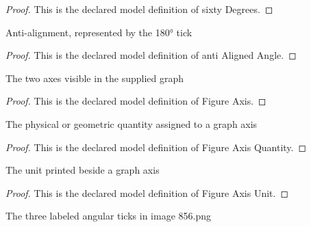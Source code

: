 \begin{proof}
  This is the declared model definition of sixty Degrees.
\end{proof}
\begin{definition}
  \label{def:physics:phyx-mini-0856:phyxminiproblems-problemphyxmini0856-antialignedangle}
  Anti-alignment, represented by the 180° tick
\end{definition}
\begin{proof}
  This is the declared model definition of anti Aligned Angle.
\end{proof}
\begin{definition}
  \label{def:physics:phyx-mini-0856:phyxminiproblems-problemphyxmini0856-figureaxis}
  The two axes visible in the supplied graph
\end{definition}
\begin{proof}
  This is the declared model definition of Figure Axis.
\end{proof}
\begin{definition}
  \label{def:physics:phyx-mini-0856:phyxminiproblems-problemphyxmini0856-figureaxisquantity}
  The physical or geometric quantity assigned to a graph axis
\end{definition}
\begin{proof}
  This is the declared model definition of Figure Axis Quantity.
\end{proof}
\begin{definition}
  \label{def:physics:phyx-mini-0856:phyxminiproblems-problemphyxmini0856-figureaxisunit}
  The unit printed beside a graph axis
\end{definition}
\begin{proof}
  This is the declared model definition of Figure Axis Unit.
\end{proof}
\begin{definition}
  \label{def:physics:phyx-mini-0856:phyxminiproblems-problemphyxmini0856-angletick}
  The three labeled angular ticks in image 856.png
\end{definition}
